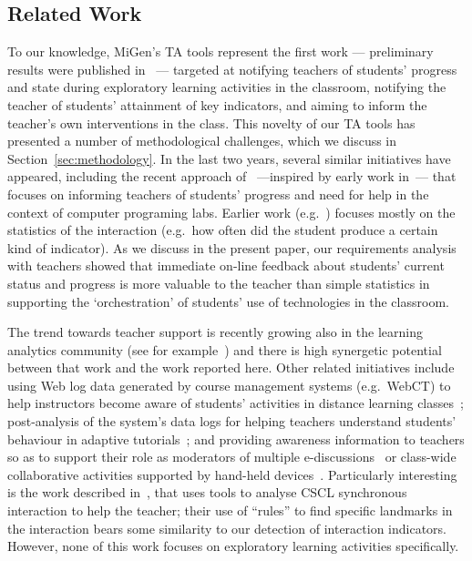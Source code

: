 \subsection{Related Work}
\label{sec:related}

To our knowledge, MiGen's TA tools represent the first work ---
preliminary results were published in~\cite{PearceLazard2010Design} --- 
targeted at notifying teachers of students' progress and state during
exploratory learning activities in the classroom, notifying the
teacher of students' attainment of key indicators, and aiming to
inform the teacher's own interventions in the class. This novelty of
our TA tools has presented a number of methodological challenges,
which we discuss in Section~\ref{sec:methodology}. 
In the last two years, several similar
initiatives have appeared, including the recent approach
of~\cite{Gutierrez12} ---inspired by early work
in~\cite{Yardi08}--- that focuses on 
informing teachers of students' progress and need for help 
in the context of computer programing labs.
Earlier work (e.g.~\cite{Gueraud09}) focuses mostly on the statistics
 of the interaction (e.g.~how often did the student produce a certain
 kind of indicator). As we discuss in the present paper, our requirements
 analysis with teachers showed that immediate on-line feedback
 about students' current status and progress
 is more valuable to the teacher than simple statistics in supporting the
 `orchestration' of students' use of technologies in the classroom. 

The trend towards teacher support is recently growing 
also in the learning analytics community
(see for example~\cite{Crespo12,Zaldivar12,Pardo12}) and there is high
synergetic potential between that work and the work reported here.
Other related initiatives include 
using Web log data generated by course management systems
(e.g.~WebCT) to help instructors become aware of students'
activities in distance learning classes~\cite{Mazza07}; post-analysis of
the system's data logs for helping teachers understand students'
behaviour in adaptive tutorials~\cite{BenAnim08}; 
and providing
awareness information to teachers so as to support their role as 
moderators of multiple e-discussions~\cite{Wichmann09} or class-wide
collaborative activities supported by hand-held devices~\cite{CortezNussbaum2009}. 
%
Particularly interesting is the work described 
in~\cite{Avouris08}, that uses tools to analyse CSCL 
synchronous interaction to help the teacher; their use of ``rules'' to
find specific landmarks in the interaction bears some
similarity to our detection of interaction indicators.  
%
However, none of this work
focuses on exploratory learning activities specifically. 

